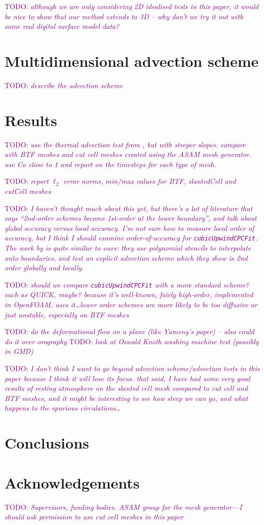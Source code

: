 \documentclass{article}
\newcommand{\TODO}[1]{\textcolor{purple}{TODO: \emph{#1}}}
\begin{document}
\TODO{although we are only considering 2D idealised tests in this paper, it would be nice to show that our method extends to 3D -- why don't we try it out with some real digital surface model data?}

\section{Multidimensional advection scheme}
\TODO{describe the advection scheme}

\section{Results}
\TODO{use the thermal advection test from \citet{shaw-weller2016}, but with steeper slopes.  compare with BTF meshes and cut cell meshes created using the ASAM mesh generator.  use Co close to 1 and report on the timesteps for each type of mesh.}

\TODO{report $\ell_2$ error norms, min/max values for BTF, slantedCell and cutCell meshes}

\TODO{I haven't thought much about this yet, but there's a lot of literature that says ``2nd-order schemes become 1st-order at the lower boundary'', and talk about global accuracy versus local accuracy.  I'm not sure how to measure local order of accuracy, but I think I should examine order-of-accuracy for \texttt{cubicUpwindCPCFit}.  The work by \citet{ye1999} is quite similar to ours: they use polynomial stencils to interpolate onto boundaries, and test an explicit advection scheme which they show is 2nd order globally and locally.}

\TODO{should we compare \texttt{cubicUpwindCPCFit} with a more standard scheme?  such as QUICK, maybe?  because it's well-known, fairly high-order, implemented in OpenFOAM, \citet{kirkpatrick2003} uses it\ldots  lower order schemes are more likely to be too diffusive or just unstable, especially on BTF meshes}

\TODO{do the deformational flow on a plane (like Yumeng's paper) -- also could do it over orography}
\TODO{look at Oswald Knoth washing machine test (possibly in GMD)}

\TODO{I don't think I want to go beyond advection scheme/advection tests in this paper because I think it will lose its focus.  that said, I have had some very good results of resting atmosphere on the slanted cell mesh compared to cut cell and BTF meshes, and it might be interesting to see how steep we can go, and what happens to the spurious circulations\ldots}

\section{Conclusions}


\section{Acknowledgements}
\TODO{Supervisors, funding bodies.  ASAM group for the mesh generator---I should ask permission to use cut cell meshes in this paper}



\end{document}
